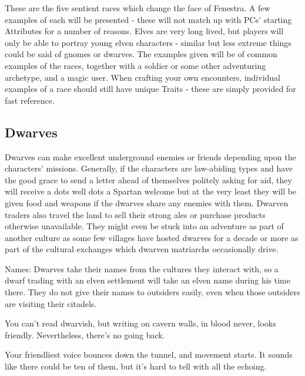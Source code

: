 \begin{multicols}{2}

These are the five sentient races which change the face of Fenestra.  A few examples of each will be presented - these will not match up with PCs' starting Attributes for a number of reasons.  Elves are very long lived, but players will only be able to portray young elven characters - similar but less extreme things could be said of gnomes or dwarves.  The examples given will be of common examples of the races, together with a soldier or some other adventuring archetype, and a magic user.  When crafting your own encounters, individual examples of a race should still have unique Traits - these are simply provided for fast reference.

\subsection{Dwarves}

Dwarves can make excellent underground enemies or friends depending upon the characters' missions.
Generally, if the characters are law-abiding types and have the good grace to send a letter ahead of themselves politely asking for aid, they will receive a dots well dots a Spartan welcome but at the very least they will be given food and weapons if the dwarves share any enemies with them.
Dwarven traders also travel the land to sell their strong ales or purchase products otherwise unavailable.
They might even be stuck into an adventure as part of another culture as some few villages have hosted dwarves for a decade or more as part of the cultural exchanges which dwarven matriarchs occasionally drive.

Names: Dwarves take their names from the cultures they interact with, so a dwarf trading with an elven settlement will take an elven name during his time there.
They do not give their names to outsiders easily, even when those outsiders are visiting their citadels.

\begin{boxtext}

	You can't read dwarvish, but writing on cavern walls, in blood never, looks friendly.
	Nevertheless, there's no going back.

\end{boxtext}

\begin{boxtext}

	Your friendliest voice bounces down the tunnel, and movement starts.
	It sounds like there could be ten of them, but it's hard to tell with all the echoing.


\end{boxtext}
\end{multicols}

